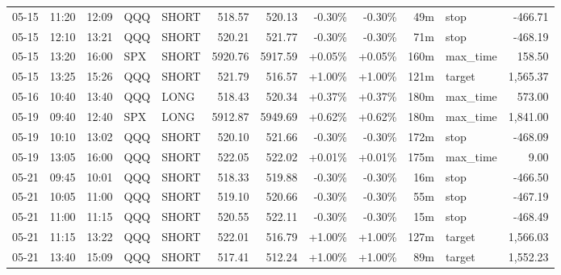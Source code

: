 \documentclass[11pt,a4paper,twoside]{article}
\begin{document}
\begin{center}
\begin{longtable}{>{\color{txtmain}}l l l l l r r r r r >{\color{txtmain}}l r}
05-15 & 11:20 & 12:09 & QQQ & SHORT & 518.57 & 520.13 & \textcolor{lossred}{-0.30\%} & \textcolor{lossred}{-0.30\%} & 49m & stop & \textcolor{lossred}{-466.71} \\
05-15 & 12:10 & 13:21 & QQQ & SHORT & 520.21 & 521.77 & \textcolor{lossred}{-0.30\%} & \textcolor{lossred}{-0.30\%} & 71m & stop & \textcolor{lossred}{-468.19} \\
05-15 & 13:20 & 16:00 & SPX & SHORT & 5920.76 & 5917.59 & \textcolor{wingreen}{+0.05\%} & \textcolor{wingreen}{+0.05\%} & 160m & max\_time & \textcolor{wingreen}{158.50} \\
05-15 & 13:25 & 15:26 & QQQ & SHORT & 521.79 & 516.57 & \textcolor{wingreen}{+1.00\%} & \textcolor{wingreen}{+1.00\%} & 121m & target & \textcolor{wingreen}{1,565.37} \\
05-16 & 10:40 & 13:40 & QQQ & LONG & 518.43 & 520.34 & \textcolor{wingreen}{+0.37\%} & \textcolor{wingreen}{+0.37\%} & 180m & max\_time & \textcolor{wingreen}{573.00} \\
05-19 & 09:40 & 12:40 & SPX & LONG & 5912.87 & 5949.69 & \textcolor{wingreen}{+0.62\%} & \textcolor{wingreen}{+0.62\%} & 180m & max\_time & \textcolor{wingreen}{1,841.00} \\
05-19 & 10:10 & 13:02 & QQQ & SHORT & 520.10 & 521.66 & \textcolor{lossred}{-0.30\%} & \textcolor{lossred}{-0.30\%} & 172m & stop & \textcolor{lossred}{-468.09} \\
05-19 & 13:05 & 16:00 & QQQ & SHORT & 522.05 & 522.02 & \textcolor{wingreen}{+0.01\%} & \textcolor{wingreen}{+0.01\%} & 175m & max\_time & \textcolor{wingreen}{9.00} \\
05-21 & 09:45 & 10:01 & QQQ & SHORT & 518.33 & 519.88 & \textcolor{lossred}{-0.30\%} & \textcolor{lossred}{-0.30\%} & 16m & stop & \textcolor{lossred}{-466.50} \\
05-21 & 10:05 & 11:00 & QQQ & SHORT & 519.10 & 520.66 & \textcolor{lossred}{-0.30\%} & \textcolor{lossred}{-0.30\%} & 55m & stop & \textcolor{lossred}{-467.19} \\
05-21 & 11:00 & 11:15 & QQQ & SHORT & 520.55 & 522.11 & \textcolor{lossred}{-0.30\%} & \textcolor{lossred}{-0.30\%} & 15m & stop & \textcolor{lossred}{-468.49} \\
05-21 & 11:15 & 13:22 & QQQ & SHORT & 522.01 & 516.79 & \textcolor{wingreen}{+1.00\%} & \textcolor{wingreen}{+1.00\%} & 127m & target & \textcolor{wingreen}{1,566.03} \\
05-21 & 13:40 & 15:09 & QQQ & SHORT & 517.41 & 512.24 & \textcolor{wingreen}{+1.00\%} & \textcolor{wingreen}{+1.00\%} & 89m & target & \textcolor{wingreen}{1,552.23} \\

\end{longtable}
\end{center}
\end{document}
